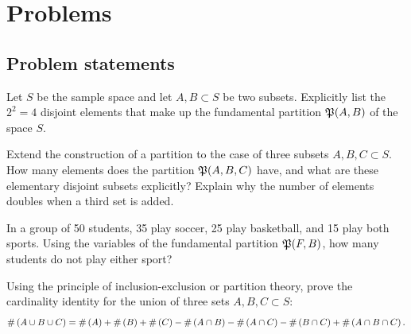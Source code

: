 \section*{Problems}

\subsection*{Problem statements}

\begin{problema}
	\label{prob:b94325d}
	Let $S$ be the sample space and let $A, B \subset S$ be two subsets. Explicitly list the $2^2 = 4$ disjoint elements that make up the fundamental partition $\mathfrak{P}(A,B)$ of the space $S$.
\end{problema}

\begin{problema}
	\label{prob:320d62d}
	Extend the construction of a partition to the case of three subsets $A, B, C \subset S$. How many elements does the partition $\mathfrak{P}(A,B,C)$ have, and what are these elementary disjoint subsets explicitly? Explain why the number of elements doubles when a third set is added.
\end{problema}

\begin{problema}
	\label{prob:18eada9}
	In a group of 50 students, 35 play soccer, 25 play basketball, and 15 play both sports. Using the variables of the fundamental partition $\mathfrak{P}(F,B)$, how many students do not play either sport?
\end{problema}

\begin{problema}
	\label{prob:6d1bd44}
	Using the principle of inclusion-exclusion or partition theory, prove the cardinality identity for the union of three sets $A, B, C \subset S$:
	\begin{align}
		\#\left( A \cup B \cup C \right) = \#\left( A \right) + \#\left( B \right) + \#\left( C \right) - \#\left( A \cap B \right) - \#\left( A \cap C \right) - \#\left( B \cap C \right) + \#\left( A \cap B \cap C \right).
	\end{align}
\end{problema}

